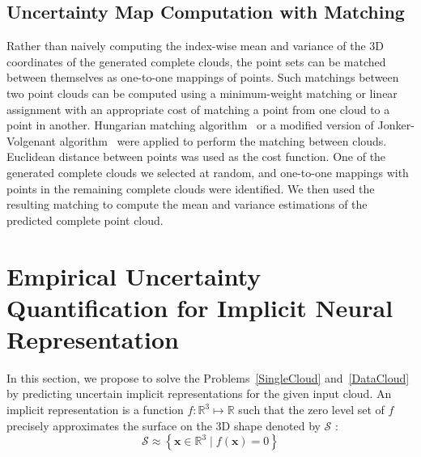     \subsection{Uncertainty Map Computation with Matching}
    Rather than naively computing the index-wise mean and variance of the 3D coordinates of the generated complete clouds, the point sets can be matched between themselves as one-to-one mappings of points. Such matchings between two point clouds can be computed using a minimum-weight matching or linear assignment with an appropriate cost of matching a point from one cloud to a point in another. Hungarian matching algorithm~\cite{Hungarian} or a modified version of Jonker-Volgenant algorithm~\cite{RectAssign} were applied to perform the matching between clouds. Euclidean distance between points was used as the cost function. One of the generated complete clouds we selected at random, and one-to-one mappings with points in the remaining complete clouds were identified. We then used the resulting matching to compute the mean and variance estimations of the predicted complete point cloud.


\section{Empirical Uncertainty Quantification for Implicit Neural Representation}\label{euqinr}
In this section, we propose to solve the Problems~\ref{SingleCloud} and~\ref{DataCloud} by predicting uncertain implicit representations for the given input cloud. An implicit representation is a function $f: \mathbb{R}^{3} \mapsto \mathbb{R}$ such that the zero level set of $f$ precisely approximates the surface on the 3D shape denoted by $\mathcal{S}$ :
\begin{equation}
\mathcal{S} \approx \left\{\mathbf{x} \in \mathbb{R}^{3} \mid f(\mathbf{x})=0\right\}
\end{equation}
\newline

